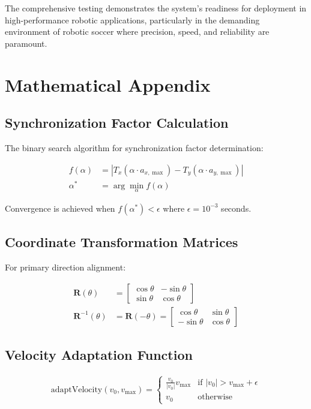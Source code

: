 \documentclass[12pt,a4paper]{article}
\begin{document}
The comprehensive testing demonstrates the system's readiness for deployment in high-performance robotic applications, particularly in the demanding environment of robotic soccer where precision, speed, and reliability are paramount.

\section{Mathematical Appendix}

\subsection{Synchronization Factor Calculation}

The binary search algorithm for synchronization factor determination:

\begin{align}
f(\alpha) &= |T_x(\alpha \cdot a_{x,\max}) - T_y(\alpha \cdot a_{y,\max})| \\
\alpha^* &= \arg\min_\alpha f(\alpha)
\end{align}

Convergence is achieved when $f(\alpha^*) < \epsilon$ where $\epsilon = 10^{-3}$ seconds.

\subsection{Coordinate Transformation Matrices}

For primary direction alignment:

\begin{align}
\mathbf{R}(\theta) &= \begin{bmatrix} \cos\theta & -\sin\theta \\ \sin\theta & \cos\theta \end{bmatrix} \\
\mathbf{R}^{-1}(\theta) &= \mathbf{R}(-\theta) = \begin{bmatrix} \cos\theta & \sin\theta \\ -\sin\theta & \cos\theta \end{bmatrix}
\end{align}

\subsection{Velocity Adaptation Function}

\begin{align}
\text{adaptVelocity}(v_0, v_{\max}) = \begin{cases}
\frac{v_0}{|v_0|} v_{\max} & \text{if } |v_0| > v_{\max} + \epsilon \\
v_0 & \text{otherwise}
\end{cases}
\end{align}
\end{document}
